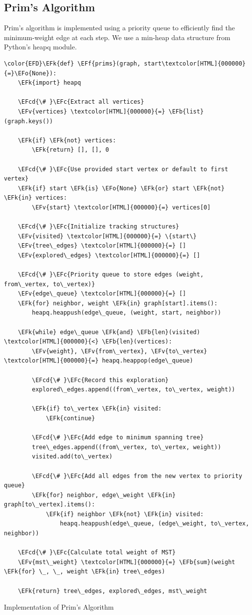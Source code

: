 \documentclass[a4paper,12pt]{article}
\newcommand{\EFc}[1]{\textcolor{EFc}{#1}} %
\newcommand{\EFcd}[1]{\textcolor{EFcd}{#1}} %
\newcommand{\EFk}[1]{\textcolor{EFk}{#1}} %
\newcommand{\EFb}[1]{\textcolor{EFb}{#1}} %
\newcommand{\EFf}[1]{\textcolor{EFf}{#1}} %
\newcommand{\EFv}[1]{\textcolor{EFv}{#1}} %
\newcommand{\EFo}[1]{\textcolor{EFo}{#1}} %
\begin{document}
\subsection{Prim's Algorithm}
\label{sec:org6dc86c1}
Prim's algorithm is implemented using a priority queue to efficiently find the minimum-weight edge at each step. We use a min-heap data structure from Python's heapq module.
\begin{listing}[htbp]
\begin{Code}
\begin{Verbatim}
\color{EFD}\EFk{def} \EFf{prims}(graph, start\textcolor[HTML]{000000}{=}\EFo{None}):
    \EFk{import} heapq

    \EFcd{\# }\EFc{Extract all vertices}
    \EFv{vertices} \textcolor[HTML]{000000}{=} \EFb{list}(graph.keys())

    \EFk{if} \EFk{not} vertices:
        \EFk{return} [], [], 0

    \EFcd{\# }\EFc{Use provided start vertex or default to first vertex}
    \EFk{if} start \EFk{is} \EFo{None} \EFk{or} start \EFk{not} \EFk{in} vertices:
        \EFv{start} \textcolor[HTML]{000000}{=} vertices[0]

    \EFcd{\# }\EFc{Initialize tracking structures}
    \EFv{visited} \textcolor[HTML]{000000}{=} \{start\}
    \EFv{tree\_edges} \textcolor[HTML]{000000}{=} []
    \EFv{explored\_edges} \textcolor[HTML]{000000}{=} []

    \EFcd{\# }\EFc{Priority queue to store edges (weight, from\_vertex, to\_vertex)}
    \EFv{edge\_queue} \textcolor[HTML]{000000}{=} []
    \EFk{for} neighbor, weight \EFk{in} graph[start].items():
        heapq.heappush(edge\_queue, (weight, start, neighbor))

    \EFk{while} edge\_queue \EFk{and} \EFb{len}(visited) \textcolor[HTML]{000000}{<} \EFb{len}(vertices):
        \EFv{weight}, \EFv{from\_vertex}, \EFv{to\_vertex} \textcolor[HTML]{000000}{=} heapq.heappop(edge\_queue)

        \EFcd{\# }\EFc{Record this exploration}
        explored\_edges.append((from\_vertex, to\_vertex, weight))

        \EFk{if} to\_vertex \EFk{in} visited:
            \EFk{continue}

        \EFcd{\# }\EFc{Add edge to minimum spanning tree}
        tree\_edges.append((from\_vertex, to\_vertex, weight))
        visited.add(to\_vertex)

        \EFcd{\# }\EFc{Add all edges from the new vertex to priority queue}
        \EFk{for} neighbor, edge\_weight \EFk{in} graph[to\_vertex].items():
            \EFk{if} neighbor \EFk{not} \EFk{in} visited:
                heapq.heappush(edge\_queue, (edge\_weight, to\_vertex, neighbor))

    \EFcd{\# }\EFc{Calculate total weight of MST}
    \EFv{mst\_weight} \textcolor[HTML]{000000}{=} \EFb{sum}(weight \EFk{for} \_, \_, weight \EFk{in} tree\_edges)

    \EFk{return} tree\_edges, explored\_edges, mst\_weight
\end{Verbatim}
\end{Code}
\caption{\label{lst:org5e22850}Implementation of Prim's Algorithm}
\end{listing}
\clearpage
\end{document}
